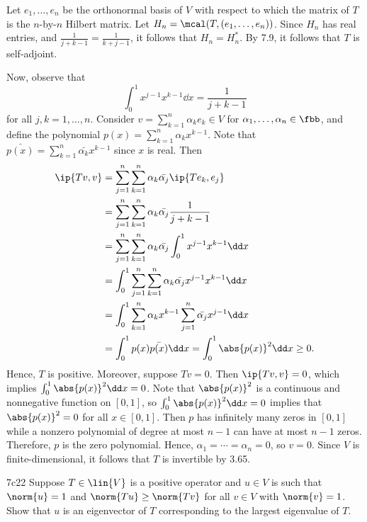 \begin{sol}
    Let $e_1, \ldots, e_n$ be the orthonormal basis of $V$ with respect to which the matrix of $T$ is the $n$-by-$n$ Hilbert matrix.
    Let $H_n = \mcal(T, (e_1, \ldots, e_n))$.
    Since $H_n$ has real entries, and $\frac{1}{j+k-1} = \frac{1}{k+j-1}$, it follows that $H_n = H_n^\ast$.
    By 7.9, it follows that $T$ is self-adjoint.

    Now, observe that
    \[
        \int_0^1 x^{j-1} x^{k-1} \dd x = \frac{1}{j+k-1}
    \]
    for all $j, k = 1, \ldots, n$.
    Consider $v = \sum_{k=1}^n \alpha_k e_k \in V$ for $\alpha_1, \ldots, \alpha_n \in \fbb$, and define the polynomial $p(x) = \sum_{k=1}^n \alpha_k x^{k-1}$.
    Note that $\bar{p(x)} = \sum_{k=1}^n \bar{\alpha_k} x^{k-1}$ since $x$ is real.
    Then
    \begin{align*}
        \ip{T v, v} &= \sum_{j=1}^n \sum_{k=1}^n \alpha_k \bar{\alpha_j} \ip{T e_k, e_j} \\
        &= \sum_{j=1}^n \sum_{k=1}^n \alpha_k \bar{\alpha_j} \frac{1}{j+k-1} \\
        &= \sum_{j=1}^n \sum_{k=1}^n \alpha_k \bar{\alpha_j} \int_0^1 x^{j-1} x^{k-1} \dd x \\
        &= \int_0^1 \sum_{j=1}^n \sum_{k=1}^n \alpha_k \bar{\alpha_j} x^{j-1} x^{k-1} \dd x \\
        &= \int_0^1 \sum_{k=1}^n \alpha_k x^{k-1} \sum_{j=1}^n \bar{\alpha_j} x^{j-1} \dd x \\
        &= \int_0^1 p(x) \bar{p(x)} \dd x = \int_0^1 \abs{p(x)}^2 \dd x \geq 0.
    \end{align*}
    Hence, $T$ is positive.
    Moreover, suppose $T v = 0$.
    Then $\ip{T v, v} = 0$, which implies $\int_0^1 \abs{p(x)}^2 \dd x = 0$.
    Note that $\abs{p(x)}^2$ is a continuous and nonnegative function on $[0, 1]$, so $\int_0^1 \abs{p(x)}^2 \dd x = 0$ implies that $\abs{p(x)}^2 = 0$ for all $x \in [0, 1]$.
    Then $p$ has infinitely many zeros in $[0, 1]$ while a nonzero polynomial of degree at most $n-1$ can have at most $n-1$ zeros.
    Therefore, $p$ is the zero polynomial.
    Hence, $\alpha_1 = \cdots = \alpha_n = 0$, so $v = 0$.
    Since $V$ is finite-dimensional, it follows that $T$ is invertible by 3.65.
\end{sol}

\begin{exercise}{7c22}
    Suppose $T \in \lin{V}$ is a positive operator and $u \in V$ is such that $\norm{u} = 1$ and $\norm{Tu} \geq \norm{Tv}$ for all $v \in V$ with $\norm{v} = 1$.
    Show that $u$ is an eigenvector of $T$ corresponding to the largest eigenvalue of $T$.
\end{exercise}

